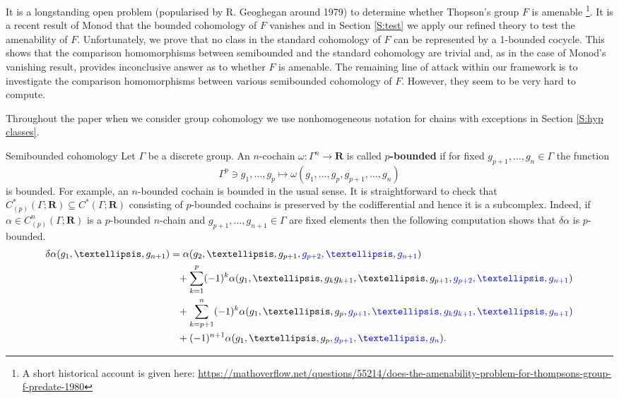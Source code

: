 \documentclass[12pt,reqno,a4paper]{amsart}
\makeatletter
\def\section{\@startsection{section}{1}%
  \z@{.7\linespacing\@plus\linespacing}{.5\linespacing}%
  {\normalfont\bfseries\raggedright\boldmath}}
\renewcommand{\emph}[1]{{\bfseries\boldmath #1}}
\theoremstyle{definition}
\theoremstyle{remark}
\numberwithin{equation}{section}
\numberwithin{figure}{section}
\newcommand{\B}[1]{{\mathbf #1}}
\makeatother
\begin{document}
It is a longstanding open problem (popularised by R. Geoghegan around 1979) to
determine whether Thopson's group $F$ is amenable
\footnote{
A short historical account is given here: 
\url{https://mathoverflow.net/questions/55214/does-the-amenability-problem-for-thompsons-group-f-predate-1980}
}.
It is a recent result of Monod that the bounded cohomology of $F$ vanishes
\cite{zbMATH07536483} and in Section \ref{S:test} we apply our refined theory
to test the amenability of $F$. Unfortunately, we prove that no class in the
standard cohomology of $F$ can be represented by a 1-bounded cocycle.  This
shows that the comparison homomorphisms between semibounded and the standard
cohomology are trivial and, as in the case of Monod's vanishing result, provides
inconclusive answer as to whether $F$ is amenable. The remaining line of attack
within our framework is to investigate the comparison homomorphisms between
various semibounded cohomology of $F$.  However, they seem to be very hard to
compute.

\bigskip

Throughout the paper when  we consider group cohomology we use nonhomogeneous
notation for chains \cite{zbMATH05056625} with exceptions in Section \ref{S:hyp
classes}.





\section{Semibounded cohomology}\label{S:semi-bdd-coho}
Let $\Gamma$ be a discrete group.
An $n$-cochain
$\omega \colon \Gamma^n\to \B R$ is called \emph{$p$-bounded} if for fixed
$g_{p+1},\dots,g_{n}\in \Gamma$ the function
$$
\Gamma^p\ni g_1,\dots,g_p \mapsto \omega(g_1,\dots,g_p,g_{p+1},\dots,g_n)
$$
is bounded. For example, an $n$-bounded cochain is bounded in the usual sense.
It is straightforward to check that
$C^*_{(p)}(\Gamma;\B R)\subseteq C^*(\Gamma;\B R)$
consisting of $p$-bounded cochains is preserved by the codifferential
and hence it is a subcomplex. Indeed, if 
$\alpha \in C^{n}_{(p)}(\Gamma;\B R)$ is a $p$-bounded $n$-chain and
$g_{p+1},\ldots,g_{n+1}\in \Gamma$ are fixed elements then
the following computation shows that $\delta\alpha$ is $p$-bounded.
\begin{align*}
\delta\alpha(g_1,\ldots,g_{n+1})
&=\alpha(g_2,\ldots,g_{p+1},\textcolor{blue}{g_{p+2},\ldots,g_{n+1}})\\
&\hphantom{=}+ \sum_{k=1}^{p} (-1)^k \alpha(g_1,\ldots,g_kg_{k+1},\ldots,g_{p+1},
\textcolor{blue}{g_{p+2},\ldots,g_{n+1}})\\
&\hphantom{=}+ \sum_{k=p+1}^{n} (-1)^k \alpha(g_1,\ldots,g_p,
\textcolor{blue}{g_{p+1},\ldots,g_kg_{k+1},\ldots,g_{n+1}})\\
&\hphantom{=}
+(-1)^{n+1} \alpha(g_1,\ldots,g_p,\textcolor{blue}{g_{p+1},\ldots,g_n}).
\end{align*}
\end{document}
